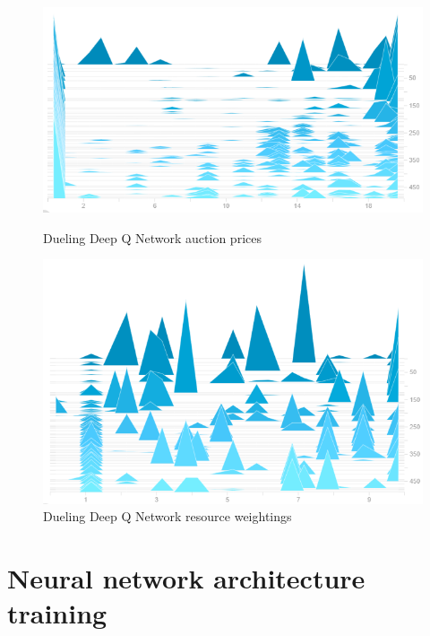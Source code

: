 \begin{figure}[h]
    \centering
    \begin{minipage}{0.5\textwidth}
        \centering
        \includegraphics[width=1.0\textwidth]{figures/algo_training_fig/dueling_dqn_auction_prices.png}
        \caption{Dueling Deep Q Network auction prices}
        \label{fig:dueling-dqn-auction-prices}
    \end{minipage}\hfill
    \begin{minipage}{0.5\textwidth}
        \centering
        \includegraphics[width=1.0\textwidth]{figures/algo_training_fig/dueling_dqn_weightings.png}
        \caption{Dueling Deep Q Network resource weightings}
        \label{fig:dueling-dqn-resource-weightings}
    \end{minipage}
\end{figure}

\section{Neural network architecture training}\label{sec:neural-network-architecture-training}

